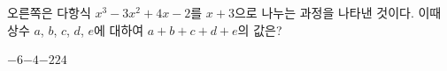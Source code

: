 \noindent\begin{minipage}[t]{0.58\linewidth}\vspace{0pt}\raggedright 오른쪽은 다항식 $x^3-3x^2+4x-2$를 $x+3$으로 나누는 과정을 나타낸 것이다. 이때 상수 $a$, $b$, $c$, $d$, $e$에 대하여 $a+b+c+d+e$의 값은?\end{minipage}\hfill\begin{minipage}[t]{0.4\linewidth}\vspace{0pt}\centering \resizebox{\ifdim\width>\linewidth\linewidth\else\width\fi}{!}{}\end{minipage}\par
\begin{choicesv}{$-6$}{$-4$}{$-2$}{$2$}{$4$}\end{choicesv}
